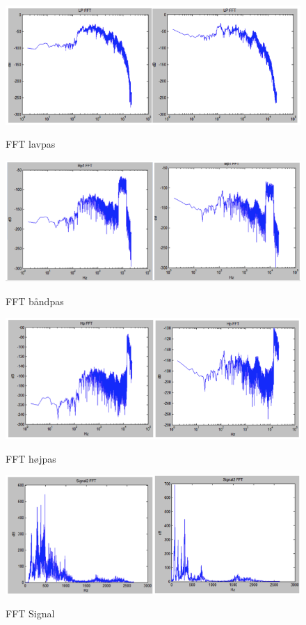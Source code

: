 \begin{figure}[H]
	\centering
	\includegraphics[width=1\textwidth]{Figurer/2}
	\label{FFT signal}
	\caption{FFT lavpas}
\end{figure}

\begin{figure}[H]
	\centering
	\includegraphics[width=1\textwidth]{Figurer/5}
	\label{FFT baandpas}
	\caption{FFT båndpas}
\end{figure}

\begin{figure}[H]
	\centering
	\includegraphics[width=1\textwidth]{Figurer/6}
	\label{FFT hoejpas}
	\caption{FFT højpas}
\end{figure}

\begin{figure}[H]
	\centering
	\includegraphics[width=1\textwidth]{Figurer/8}
	\label{FFT Signal}
	\caption{FFT Signal}
\end{figure}

